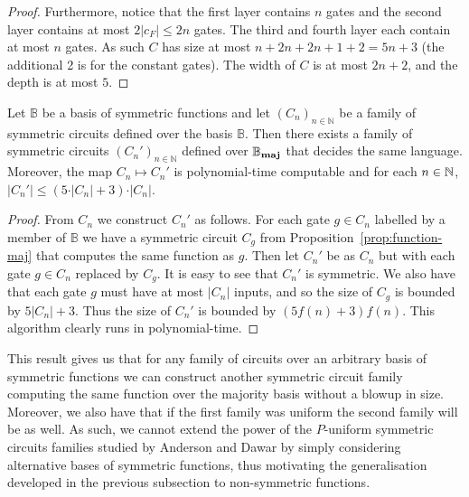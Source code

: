\documentclass[../paper.tex]{subfiles}
\begin{document}
\begin{proof}
  Furthermore, notice that the first layer contains $n$ gates and the second
  layer contains at most $2 \vert c_{F} \vert \leq 2n$ gates. The third and
  fourth layer each contain at most $n$ gates. As such $C$ has size at most $n
  + 2n + 2n + 1 + 2 = 5n +3$ (the additional 2 is for the constant gates). The
  width of $C$ is at most $2n + 2$, and the depth is at most $5$.
\end{proof}

\begin{thm}
  Let $\mathbb{B}$ be a basis of symmetric functions and let $(C_n)_{n \in
    \mathbb{N}}$ be a family of symmetric circuits defined over the basis $\mathbb{B}$. Then there exists a family
  of symmetric circuits $(C_n')_{n \in \mathbb{N}}$ defined over
  $\mathbb{B}_{\text{\textbf{maj}}}$ that decides the same language. Moreover, the map $C_n
  \mapsto C_n'$ is polynomial-time computable and for each $n \in \mathbb{N}$, $\vert
  C_n' \vert \leq (5 \cdot \vert C_n \vert + 3) \cdot \vert C_n \vert$.
\end{thm}

\begin{proof}
  From $C_n$ we construct $C_n'$ as follows. For each gate $g \in C_n$ 
  labelled by a member of $\mathbb{B}$ we have a symmetric circuit $C_g$ from
  Proposition~\ref{prop:function-maj} that computes the same function as $g$.
  Then let $C_n'$ be as $C_n$ but with each gate $g \in C_n$ replaced by $C_g$.
  It is easy to see that $C_n'$ is symmetric. We also have that each gate $g$
  must have at most $\vert C_n \vert$ inputs, and so the size of $C_g$ is
  bounded by $5 \vert C_n \vert + 3$. Thus the size of $C_n'$ is bounded by
  $(5f(n)+3) f(n)$. This algorithm clearly runs in polynomial-time.
\end{proof}

This result gives us that for any family of circuits over an arbitrary basis of
symmetric functions we can construct another symmetric circuit family
computing the same function over the majority basis without a blowup in size.
Moreover, we also have that if the first family was uniform the second family
will be as well. As such, we cannot extend the power of the $P$-uniform
symmetric circuits families studied by Anderson and Dawar \cite{AndersonD17} by
simply considering alternative bases of symmetric functions, thus motivating the
generalisation developed in the previous subsection to non-symmetric functions.
\end{document}
